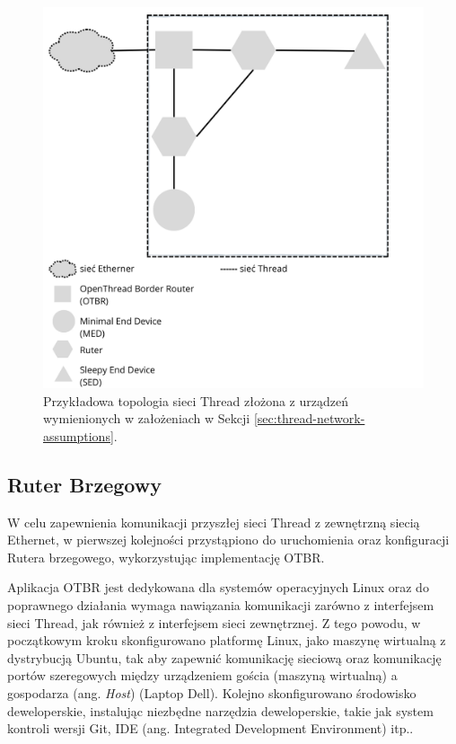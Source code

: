         \begin{figure}[H]
            \centering
            \includegraphics[width=0.8\linewidth]{graphics/thread-topology.png}
            \caption{Przykładowa topologia sieci Thread złożona z urządzeń wymienionych w założeniach w Sekcji \ref{sec:thread-network-assumptions}.}
            \label{fig:thread-topology}
        \end{figure}

    \subsection{Ruter Brzegowy}

        W celu zapewnienia komunikacji przyszłej sieci Thread z zewnętrzną siecią Ethernet, w pierwszej kolejności przystąpiono do uruchomienia oraz konfiguracji Rutera brzegowego, wykorzystując implementację OTBR. 
        
        Aplikacja OTBR jest dedykowana dla systemów operacyjnych Linux oraz do poprawnego działania wymaga nawiązania komunikacji zarówno z interfejsem sieci Thread, jak również z interfejsem sieci zewnętrznej. Z tego powodu, w początkowym kroku skonfigurowano platformę Linux, jako maszynę wirtualną z dystrybucją Ubuntu, tak aby zapewnić komunikację sieciową oraz komunikację portów szeregowych między urządzeniem gościa (maszyną wirtualną) a gospodarza (ang. \textit{Host}) (Laptop Dell). Kolejno skonfigurowano środowisko deweloperskie, instalując niezbędne narzędzia deweloperskie, takie jak system kontroli wersji Git, IDE (ang. Integrated Development Environment) itp.. 
        
